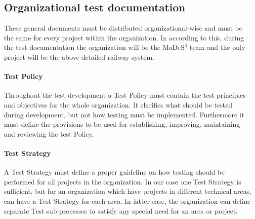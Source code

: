 \subsection{Organizational test documentation}
These general documents must be distributed organizational-wise and must be the same for every project within the organization. In according to this, during the test documentation the organization will be the MoDeS$^3$ team and the only project will be the above detailed railway system.

\paragraph{Test Policy}
Throughout the test development a Test Policy must contain the test principles and objectives for the whole organization. It clarifies what should be tested during development, but not how testing must be implemented. Furthermore it must define the provisions to be used for establishing, improving, maintaining and reviewing the test Policy.

\paragraph{Test Strategy}
A Test Strategy must define a proper guideline on how testing should be performed for all projects in the organization. In our case one Test Strategy is sufficient, but for an organization which have projects in different technical areas, can have a Test Strategy for each area. In latter case, the organization can define separate Test sub-processes to satisfy any special need for an area or project.



